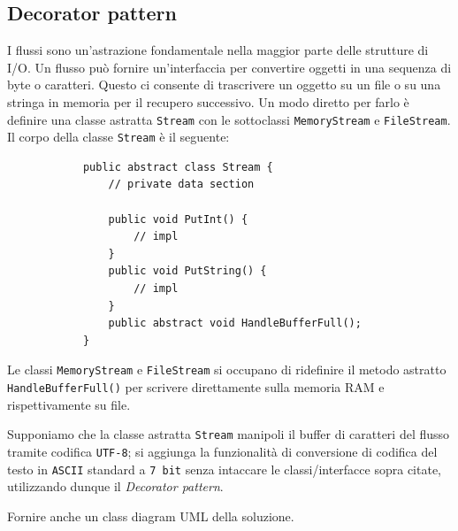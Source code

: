 \documentclass[12pt,a4paper]{article}
\begin{document}
    \subsection{Decorator pattern}
    \begin{Exercise}[origin={Ispirato ad un esempio del libro GoF}]
        I flussi sono un'astrazione fondamentale nella maggior parte delle strutture di I/O. Un flusso può fornire un'interfaccia per convertire oggetti in una sequenza di byte o caratteri. Questo ci consente di trascrivere un oggetto su un file o su una stringa in memoria per il recupero successivo. Un modo diretto per farlo è definire una classe astratta \texttt{Stream} con le sottoclassi \texttt{MemoryStream} e \texttt{FileStream}.
        Il corpo della classe \texttt{Stream} è il seguente:
        \begin{lstlisting}
            public abstract class Stream {
                // private data section
                
                public void PutInt() {
                    // impl
                }
                public void PutString() {
                    // impl
                }
                public abstract void HandleBufferFull();
            }
        \end{lstlisting}
        Le classi \texttt{MemoryStream} e \texttt{FileStream} si occupano di ridefinire il metodo astratto \texttt{HandleBufferFull()} per scrivere direttamente sulla memoria RAM e rispettivamente su file.
        
        Supponiamo che la classe astratta \texttt{Stream} manipoli il buffer di caratteri del flusso tramite codifica \texttt{UTF-8}; si aggiunga la funzionalità di conversione di codifica del testo in \texttt{ASCII} standard a \texttt{7 bit} senza intaccare le classi/interfacce sopra citate, utilizzando dunque il \textit{Decorator pattern}.

        Fornire anche un class diagram UML della soluzione.
    \end{Exercise}

\end{document}
